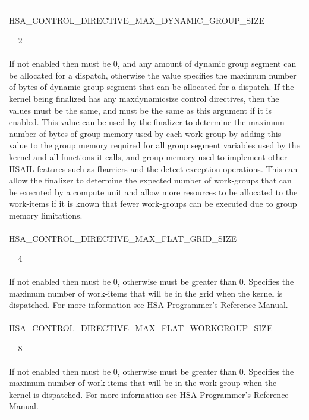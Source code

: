 \documentclass[final]{book}
\newcommand{\reftyp}[1]{#1}
\newcommand{\refenu}[1]{\reftyp{#1}}
\begin{document}
\begin{appendices}
\begin{longtable}{@{\hspace{2em}}p{\linewidth-2em}}
\hspace{-2em}\hypertarget{group--FinalizerCoreApi-1ggac86e8f3e8ccba532765320c93b18ac95a7f264d8e5d20fbd05ce0a1e834dc77c0}{\refenu{HSA_CONTROL_DIRECTIVE_MAX_DYNAMIC_GROUP_SIZE}} = 2\\If not enabled then must be 0, and any amount of dynamic group segment can be allocated for a dispatch, otherwise the value specifies the maximum number of bytes of dynamic group segment that can be allocated for a dispatch. If the kernel being finalized has any maxdynamicsize control directives, then the values must be the same, and must be the same as this argument if it is enabled. This value can be used by the finalizer to determine the maximum number of bytes of group memory used by each work-group by adding this value to the group memory required for all group segment variables used by the kernel and all functions it calls, and group memory used to implement other HSAIL features such as fbarriers and the detect exception operations. This can allow the finalizer to determine the expected number of work-groups that can be executed by a compute unit and allow more resources to be allocated to the work-items if it is known that fewer work-groups can be executed due to group memory limitations.\\[2mm]
\hspace{-2em}\hypertarget{group--FinalizerCoreApi-1ggac86e8f3e8ccba532765320c93b18ac95afa8e85a5fa9b9056c16087b77998c269}{\refenu{HSA_CONTROL_DIRECTIVE_MAX_FLAT_GRID_SIZE}} = 4\\If not enabled then must be 0, otherwise must be greater than 0. Specifies the maximum number of work-items that will be in the grid when the kernel is dispatched. For more information see HSA Programmer's Reference Manual.\\[2mm]
\hspace{-2em}\hypertarget{group--FinalizerCoreApi-1ggac86e8f3e8ccba532765320c93b18ac95aa9cb0a8c5cba874861684bd5e02b32cb}{\refenu{HSA_CONTROL_DIRECTIVE_MAX_FLAT_WORKGROUP_SIZE}} = 8\\If not enabled then must be 0, otherwise must be greater than 0. Specifies the maximum number of work-items that will be in the work-group when the kernel is dispatched. For more information see HSA Programmer's Reference Manual.\\[2mm]

\end{longtable}
\end{appendices}
\end{document}

